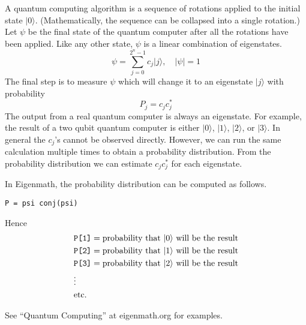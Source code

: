 \noindent
A quantum computing algorithm is a sequence of rotations
applied to the initial state $|0\rangle$.
(Mathematically, the sequence can be collapsed into a single rotation.)
Let $\psi$ be the final state of the quantum computer
after all the rotations have been applied.
Like any other state, $\psi$ is a linear combination of eigenstates.
\begin{equation*}
\psi=\sum_{j=0}^{2^n-1}c_j|j\rangle,\quad|\psi|=1
\end{equation*}
The final step is to measure $\psi$ which will
change it to an eigenstate $|j\rangle$ with
probability
\begin{equation*}
P_j=c_jc_j^*
\end{equation*}
The output from a real quantum computer is always an eigenstate.
For example, the result of a two qubit quantum computer
is either $|0\rangle$, $|1\rangle$, $|2\rangle$, or $|3\rangle$.
In general the $c_j$'s cannot be observed directly.
However, we can run the same calculation multiple times
to obtain a probability distribution.
From the probability distribution we can estimate
$c_jc_j^*$ for each eigenstate.

\bigskip
\noindent
In Eigenmath, the probability distribution can be computed as follows.
\begin{center}
\tt P = psi conj(psi)
\end{center}

\noindent
Hence
\begin{align*}
&\text{\tt P[1]}=\text{probability that $|0\rangle$ will be the result}
\\
&\text{\tt P[2]}=\text{probability that $|1\rangle$ will be the result}
\\
&\text{\tt P[3]}=\text{probability that $|2\rangle$ will be the result}
\\
&\vdots
\\
&\text{etc.}
\end{align*}

\noindent
See ``Quantum Computing'' at eigenmath.org for examples.

